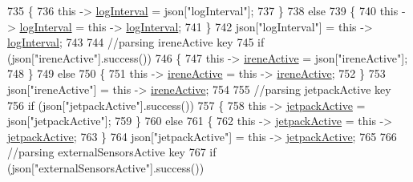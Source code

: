 \begin{DoxyCode}
735             \{
736                 \textcolor{keyword}{this} -> \hyperlink{class_cool_board_a84bc94413b64973e4aba8c467c97006c}{logInterval} = json[\textcolor{stringliteral}{"logInterval"}];
737             \}
738             \textcolor{keywordflow}{else}
739             \{
740                 \textcolor{keyword}{this} -> \hyperlink{class_cool_board_a84bc94413b64973e4aba8c467c97006c}{logInterval} = \textcolor{keyword}{this} -> \hyperlink{class_cool_board_a84bc94413b64973e4aba8c467c97006c}{logInterval};
741             \}
742             json[\textcolor{stringliteral}{"logInterval"}] = \textcolor{keyword}{this} -> \hyperlink{class_cool_board_a84bc94413b64973e4aba8c467c97006c}{logInterval};
743             
744             \textcolor{comment}{//parsing ireneActive key           }
745             \textcolor{keywordflow}{if} (json[\textcolor{stringliteral}{"ireneActive"}].success())
746             \{
747                 \textcolor{keyword}{this} -> \hyperlink{class_cool_board_a9c3f7ac625481ee2ae802a25d97a4ae0}{ireneActive} = json[\textcolor{stringliteral}{"ireneActive"}];
748             \}
749             \textcolor{keywordflow}{else}
750             \{
751                 \textcolor{keyword}{this} -> \hyperlink{class_cool_board_a9c3f7ac625481ee2ae802a25d97a4ae0}{ireneActive} = \textcolor{keyword}{this} -> \hyperlink{class_cool_board_a9c3f7ac625481ee2ae802a25d97a4ae0}{ireneActive};
752             \}
753             json[\textcolor{stringliteral}{"ireneActive"}] = \textcolor{keyword}{this} -> \hyperlink{class_cool_board_a9c3f7ac625481ee2ae802a25d97a4ae0}{ireneActive};
754             
755             \textcolor{comment}{//parsing jetpackActive key}
756             \textcolor{keywordflow}{if} (json[\textcolor{stringliteral}{"jetpackActive"}].success())
757             \{
758                 \textcolor{keyword}{this} -> \hyperlink{class_cool_board_a9be03a913d26e558328935ca3b59a75e}{jetpackActive} = json[\textcolor{stringliteral}{"jetpackActive"}];
759             \}
760             \textcolor{keywordflow}{else}
761             \{
762                 \textcolor{keyword}{this} -> \hyperlink{class_cool_board_a9be03a913d26e558328935ca3b59a75e}{jetpackActive} = \textcolor{keyword}{this} -> \hyperlink{class_cool_board_a9be03a913d26e558328935ca3b59a75e}{jetpackActive};
763             \}
764             json[\textcolor{stringliteral}{"jetpackActive"}] = \textcolor{keyword}{this} -> \hyperlink{class_cool_board_a9be03a913d26e558328935ca3b59a75e}{jetpackActive};
765 
766             \textcolor{comment}{//parsing externalSensorsActive key}
767             \textcolor{keywordflow}{if} (json[\textcolor{stringliteral}{"externalSensorsActive"}].success())

\end{DoxyCode}

